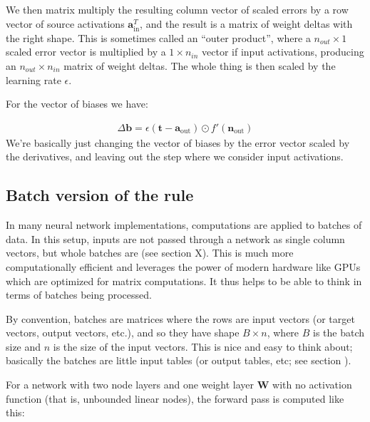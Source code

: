 We then matrix multiply the resulting column vector of scaled errors by a row vector of source activations $ \mathbf{a}_{\text{in}}^T$, and the result is a matrix of weight deltas with the right shape. This is sometimes called an ``outer product'', where a $n_{out} \times 1$ scaled error vector is multiplied by a  $1 \times n_{in}$ vector if input activations, producing an $n_{out} \times n_{in}$ matrix of weight deltas. The whole thing is then scaled by the learning rate $\epsilon$.

For the vector of biases we have:

\begin{eqnarray*}
\Delta \mathbf{b}  =  \epsilon (\mathbf{t} - \mathbf{a}_{\text{out}}) \odot f'( \mathbf{n}_{\text{out}})
\end{eqnarray*}
We're basically just changing the vector of biases by the error vector scaled by the derivatives, and leaving out the step where we consider input activations.

\subsection{Batch version of the rule}

In many neural network implementations, computations are applied to batches of data. In this setup, inputs are not passed through a network as single column vectors, but whole batches are (see section X). This is much more computationally efficient and leverages the power of modern hardware like GPUs which are optimized for matrix computations.  It thus helps to be able to think in terms of batches being processed.

By convention, batches are matrices where the rows are input vectors (or target vectors, output vectors, etc.), and so they have shape $B \times n$, where $B$ is the batch size and $n$ is the size of the input vectors. This is nice and easy to think about; basically the batches are little input tables (or output tables, etc; see section ).


For a network with two node layers and one weight layer $\mathbf{W}$ with no activation function (that is, unbounded linear nodes), the forward pass is computed like this:

